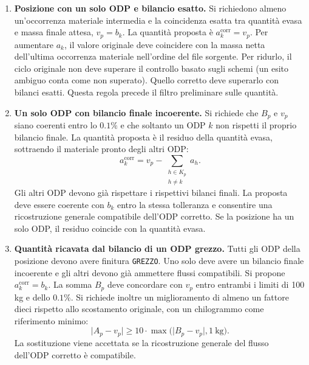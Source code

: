 \begin{enumerate}[label=\arabic*.,itemsep=6pt]

\item \textbf{Posizione con un solo ODP e bilancio esatto.} Si richiedono almeno un'occorrenza materiale intermedia e la coincidenza esatta tra quantità evasa e massa finale attesa, $v_p=b_k$. La quantità proposta è $a_k^{\mathrm{corr}}=v_p$. Per aumentare $a_k$, il valore originale deve coincidere con la massa netta dell'ultima occorrenza materiale nell'ordine del file sorgente. Per ridurlo, il ciclo originale non deve superare il controllo basato sugli schemi (un esito ambiguo conta come non superato). Quello corretto deve superarlo con bilanci esatti. Questa regola precede il filtro preliminare sulle quantità.

\item \textbf{Un solo ODP con bilancio finale incoerente.} Si richiede che $B_p$ e $v_p$ siano coerenti entro lo $0.1\%$ e che soltanto un ODP $k$ non rispetti il proprio bilancio finale. La quantità proposta è il residuo della quantità evasa, sottraendo il materiale pronto degli altri ODP:
\begin{equation}
\label{eq:single-child-ready-residual}
a_k^{\mathrm{corr}}=v_p-\sum_{\substack{h\in K_p\\h\neq k}}a_h.
\end{equation}
Gli altri ODP devono già rispettare i rispettivi bilanci finali. La proposta deve essere coerente con $b_k$ entro la stessa tolleranza e consentire una ricostruzione generale compatibile dell'ODP corretto. Se la posizione ha un solo ODP, il residuo coincide con la quantità evasa.

\item \textbf{Quantità ricavata dal bilancio di un ODP grezzo.} Tutti gli ODP della posizione devono avere finitura \texttt{GREZZO}. Uno solo deve avere un bilancio finale incoerente e gli altri devono già ammettere flussi compatibili. Si propone $a_k^{\mathrm{corr}}=b_k$. La somma $B_p$ deve concordare con $v_p$ entro entrambi i limiti di 100 kg e dello $0.1\%$. Si richiede inoltre un miglioramento di almeno un fattore dieci rispetto allo scostamento originale, con un chilogrammo come riferimento minimo:
\begin{equation}
\label{eq:commercial-corroboration-improvement}
\lvert A_p-v_p\rvert\geq 10\cdot\max\bigl(\lvert B_p-v_p\rvert,1\ \mathrm{kg}\bigr).
\end{equation}
La sostituzione viene accettata se la ricostruzione generale del flusso dell'ODP corretto è compatibile.


\end{enumerate}
